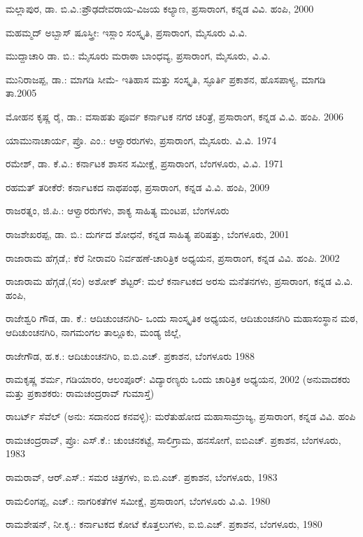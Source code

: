\noindent
ಮಲ್ಲಾಪುರ, ಡಾ. ಬಿ.ವಿ.:ಪ್ರೌಢದೇವರಾಯ-ವಿಜಯ ಕಲ್ಯಾಣ, ಪ್ರಸಾರಾಂಗ, ಕನ್ನಡ ವಿವಿ. ಹಂಪಿ, 2000

\noindent
ಮಹಮ್ಮದ್​ ಅಬ್ಬಾಸ್​ ಷೂಸ್ತ್ರೀ: ಇಸ್ಲಾಂ ಸಂಸ್ಕೃತಿ, ಪ್ರಸಾರಾಂಗ, ಮೈಸೂರು ವಿ.ವಿ.

\noindent
ಮುದ್ದಾಚಾರಿ ಡಾ. ಬಿ.: ಮೈಸೂರು ಮರಾಠಾ ಬಾಂಧವ್ಯ, ಪ್ರಸಾರಾಂಗ, ಮೈಸೂರು, ವಿ.ವಿ. 

\noindent
ಮುನಿರಾಜಪ್ಪ, ಡಾ.: ಮಾಗಡಿ ಸೀಮೆ- ಇತಿಹಾಸ ಮತ್ತು ಸಂಸ್ಕೃತಿ, ಸ್ಫೂರ್ತಿ ಪ್ರಕಾಶನ, ಹೊಸಪಾಳ್ಯ, ಮಾಗಡಿ ತಾ.2005

\noindent
ಮೋಹನ ಕೃಷ್ಣ ರೈ, ಡಾ.: ವಸಾಹತು ಪೂರ್ವ ಕರ್ನಾಟಕ ನಗರ ಚರಿತ್ರೆ, ಪ್ರಸಾರಾಂಗ, ಕನ್ನಡ ವಿ.ವಿ. ಹಂಪಿ. 2006

\noindent
ಯಾಮುನಾಚಾರ್ಯ, ಪ್ರೊ. ಎಂ.: ಆಳ್ವಾರರುಗಳು, ಪ್ರಸಾರಾಂಗ, ಮೈಸೂರು. ವಿ.ವಿ. 1974

\noindent
ರಮೇಶ್​, ಡಾ. ಕೆ.ವಿ.: ಕರ್ನಾಟಕ ಶಾಸನ ಸಮೀಕ್ಷೆ, ಪ್ರಸಾರಾಂಗ, ಬೆಂಗಳೂರು, ವಿ.ವಿ. 1971

\noindent
ರಹಮತ್​ ತರೀಕೆರೆ: ಕರ್ನಾಟಕದ ನಾಥಪಂಥ, ಪ್ರಸಾರಾಂಗ, ಕನ್ನಡ ವಿ.ವಿ. ಹಂಪಿ, 2009

\noindent
ರಾಜರತ್ನಂ, ಜಿ.ಪಿ.: ಆಳ್ವಾರರುಗಳು, ಶಾಕ್ಯ ಸಾಹಿತ್ಯ ಮಂಟಪ, ಬೆಂಗಳೂರು

\noindent
ರಾಜಶೇಖರಪ್ಪ, ಡಾ. ಬಿ.: ದುರ್ಗದ ಶೋಧನೆ, ಕನ್ನಡ ಸಾಹಿತ್ಯ ಪರಿಷತ್ತು, ಬೆಂಗಳೂರು, 2001

\noindent
ರಾಜಾರಾಮ ಹೆಗ್ಗಡೆ,: ಕೆರೆ ನೀರಾವರಿ ನಿರ್ವಹಣೆ-ಚಾರಿತ್ರಿಕ ಅಧ್ಯಯನ, ಪ್ರಸಾರಾಂಗ, ಕನ್ನಡ ವಿವಿ. ಹಂಪಿ. 2002

\noindent
ರಾಜಾರಾಮ ಹೆಗ್ಗಡೆ,(ಸಂ) ಅಶೋಕ್​ ಶೆಟ್ಟರ್​: ಮಲೆ ಕರ್ನಾಟಕದ ಅರಸು ಮನೆತನಗಳು, ಪ್ರಸಾರಾಂಗ, ಕನ್ನಡ ವಿ.ವಿ. ಹಂಪಿ,

\noindent
ರಾಜೇಶ್ವರಿ ಗೌಡ, ಡಾ. ಕೆ.: ಆದಿಚುಂಚನಗಿರಿ- ಒಂದು ಸಾಂಸ್ಕೃತಿಕ ಅಧ್ಯಯನ, ಆದಿಚುಂಚನಗಿರಿ ಮಹಾಸಂಸ್ಥಾನ ಮಠ, ಆದಿಚುಂಚನಗಿರಿ, ನಾಗಮಂಗಲ ತಾಲ್ಲೂಕು, ಮಂಡ್ಯ ಜಿಲ್ಲೆ,

\noindent
ರಾಜೇಗೌಡ, ಹ.ಕ.: ಆದಿಚುಂಚನಗಿರಿ, ಐ.ಬಿ.ಎಚ್​. ಪ್ರಕಾಶನ, ಬೆಂಗಳೂರು 1988

\noindent
ರಾಮಕೃಷ್ಣ ಶರ್ಮ, ಗಡಿಯಾರಂ, ಆಲಂಪೂರ್​: ವಿದ್ಯಾರಣ್ಯರು ಒಂದು ಚಾರಿತ್ರಿಕ ಅಧ್ಯಯನ, 2002 (ಅನುವಾದಕರು ಮತ್ತು ಪ್ರಕಾಶಕರು: ರಾಮಚಂದ್ರರಾವ್​ ಗುಮಾಸ್ತೆ)

\noindent
ರಾಬರ್ಟ್ ಸೆವೆಲ್​ (ಅನು: ಸದಾನಂದ ಕನವಳ್ಳಿ): ಮರೆತುಹೋದ ಮಹಾಸಾಮ್ರಾಜ್ಯ, ಪ್ರಸಾರಾಂಗ, ಕನ್ನಡ ವಿವಿ. ಹಂಪಿ

\noindent
ರಾಮಚಂದ್ರರಾವ್​, ಪ್ರೊ: ಎಸ್​.ಕೆ.: ಚುಂಚನಕಟ್ಟೆ, ಸಾಲಿಗ್ರಾಮ, ಹನಸೋಗೆ, ಐಬಿಎಚ್​. ಪ್ರಕಾಶನ, ಬೆಂಗಳೂರು, 1983

\noindent
ರಾಮರಾವ್​, ಆರ್​.ಎಸ್​.: ಸಮರ ಚಿತ್ರಗಳು, ಐ.ಬಿ.ಎಚ್​. ಪ್ರಕಾಶನ, ಬೆಂಗಳೂರು, 1983

\noindent
ರಾಮಲಿಂಗಪ್ಪ, ಎಚ್​.: ನಾಗರಿಕತೆಗಳ ಸಮೀಕ್ಷೆ, ಪ್ರಸಾರಾಂಗ, ಬೆಂಗಳೂರು ವಿ.ವಿ. 1980

\noindent
ರಾಮಶೇಷನ್​, ನೀ.ಕೃ.: ಕರ್ನಾಟಕದ ಕೋಟೆ ಕೊತ್ತಲುಗಳು, ಐ.ಬಿ.ಎಚ್​. ಪ್ರಕಾಶನ, ಬೆಂಗಳೂರು, 1980

